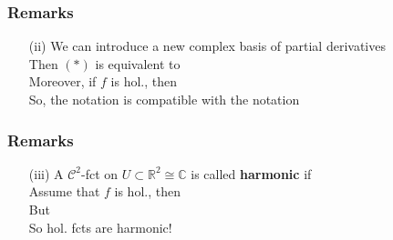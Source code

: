 \documentclass[10pt]{beamer}
\newcommand{\R}{\mathbb{R}}
\newcommand{\C}{\mathbb{C}}
\begin{document}
{\begin{frame}
\frametitle{Remarks}
\begin{itemize}
\item[(ii)] We can introduce a new complex basis of partial derivatives\\
\vspace{2cm}
Then $(*)$ is equivalent to \\
\vspace{1cm}
Moreover, if $f$ is hol.,  then\\
\vspace{1cm}
So, the notation is compatible with the notation
\\
\vspace{1cm}
\end{itemize}
\end{frame}

\begin{frame}
\frametitle{Remarks}
\begin{itemize}
\item[(iii)] A $\mathcal{C}^2$-fct on $U \subset \R^2 \cong \C$ is called \textbf{harmonic} if\\
\vspace{1cm}
Assume that $f$ is hol., then\\
But
\\
\vspace{1cm}
So hol.  fcts are harmonic!
\end{itemize}
\end{frame}

}
\end{document}

